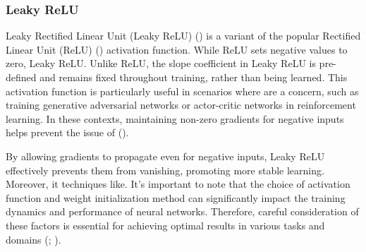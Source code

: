     \subsubsection{Leaky ReLU}
    \label{subsec:leaky-relu}

        \noindent Leaky Rectified Linear Unit (Leaky ReLU) (\cite{xu2015empirical}) is a variant of the popular Rectified Linear Unit (ReLU) (\cite{agarap2019deep}) activation function. While ReLU sets negative values to zero, Leaky ReLU. Unlike ReLU, the slope coefficient in Leaky ReLU is pre-defined and remains fixed throughout training, rather than being learned. This activation function is particularly useful in scenarios where are a concern, such as training generative adversarial networks or actor-critic networks in reinforcement learning. In these contexts, maintaining non-zero gradients for negative inputs helps prevent the issue of  (\cite{Lu_2020}).
        
        \bigskip
        
        \noindent By allowing gradients to propagate even for negative inputs, Leaky ReLU effectively prevents them from vanishing, promoting more stable learning. Moreover, it techniques like. It's important to note that the choice of activation function and weight initialization method can significantly impact the training dynamics and performance of neural networks. Therefore, careful consideration of these factors is essential for achieving optimal results in various tasks and domains (\cite{datta2020survey}; \cite{shengyi2022the37implementation}).
        
